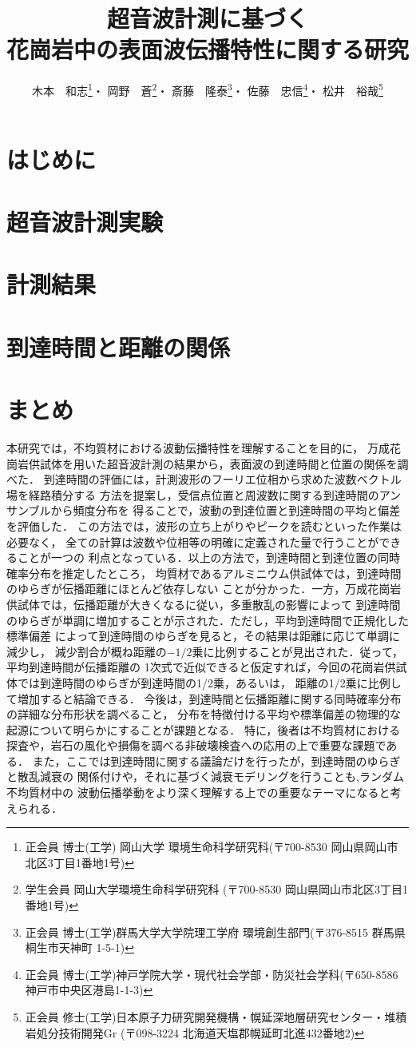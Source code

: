 \documentclass{jsce}
\title{
	超音波計測に基づく\\花崗岩中の表面波伝播特性に関する研究
}%
\author{木本　和志\thanks{正会員 博士(工学) 岡山大学 環境生命科学研究科(〒700-8530 岡山県岡山市北区3丁目1番地1号)\email{kimoto@okayama-u.ac.jp}}・
岡野　蒼\thanks{学生会員 岡山大学環境生命科学研究科 (〒700-8530 岡山県岡山市北区3丁目1番地1号)}・
斎藤　隆泰\thanks{正会員 博士(工学)群馬大学大学院理工学府 環境創生部門(〒376-8515 群馬県桐生市天神町 1-5-1)}・
佐藤　忠信\thanks{正会員 博士(工学)神戸学院大学・現代社会学部・防災社会学科(〒650-8586神戸市中央区港島1-1-3)}・
松井　裕哉\thanks{正会員 修士(工学)日本原子力研究開発機構・幌延深地層研究センター・堆積岩処分技術開発Gr
(〒098-3224 北海道天塩郡幌延町北進432番地2)}
}
\begin{document}
\maketitle
\section{はじめに}
	
\section{超音波計測実験}
	
\section{計測結果}
	
\section{到達時間と距離の関係 }
	
\section{まとめ}
本研究では，不均質材における波動伝播特性を理解することを目的に，
万成花崗岩供試体を用いた超音波計測の結果から，表面波の到達時間と位置の関係を調べた．
到達時間の評価には，計測波形のフーリエ位相から求めた波数ベクトル場を経路積分する
方法を提案し，受信点位置と周波数に関する到達時間のアンサンブルから頻度分布を
得ることで，波動の到達位置と到達時間の平均と偏差を評価した．
この方法では，波形の立ち上がりやピークを読むといった作業は必要なく，
全ての計算は波数や位相等の明確に定義された量で行うことができることが一つの
利点となっている．以上の方法で，到達時間と到達位置の同時確率分布を推定したところ，
均質材であるアルミニウム供試体では，到達時間のゆらぎが伝播距離にほとんど依存しない
ことが分かった．一方，万成花崗岩供試体では，伝播距離が大きくなるに従い，多重散乱の影響によって
到達時間のゆらぎが単調に増加することが示された．ただし，平均到達時間で正規化した標準偏差
によって到達時間のゆらぎを見ると，その結果は距離に応じて単調に減少し，
減少割合が概ね距離の$-1/2$乗に比例することが見出された．従って，平均到達時間が伝播距離の
1次式で近似できると仮定すれば，今回の花崗岩供試体では到達時間のゆらぎが到達時間の1/2乗，あるいは，
距離の1/2乗に比例して増加すると結論できる．
今後は，到達時間と伝播距離に関する同時確率分布の詳細な分布形状を調べること，
分布を特徴付ける平均や標準偏差の物理的な起源について明らかにすることが課題となる．
特に，後者は不均質材における探査や，岩石の風化や損傷を調べる非破壊検査への応用の上で重要な課題である．
また，ここでは到達時間に関する議論だけを行ったが，到達時間のゆらぎと散乱減衰の
関係付けや，それに基づく減衰モデリングを行うことも,ランダム不均質材中の
波動伝播挙動をより深く理解する上での重要なテーマになると考えられる．
\\
\end{document}
